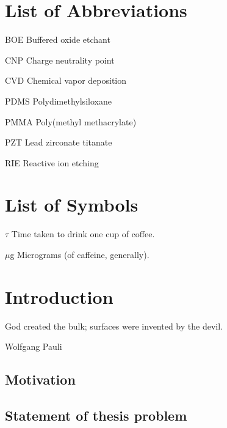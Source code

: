 \documentclass[edeposit,fullpage,draftthesis]{uiucthesis2009}
\begin{document}
\setcounter{tocdepth}{2}

\tableofcontents
\listoffigures

\chapter{List of Abbreviations}

\begin{symbollist*}
\item[BOE] Buffered oxide etchant
\item[CNP] Charge neutrality point
\item[CVD] Chemical vapor deposition
\item[PDMS] Polydimethylsiloxane
\item[PMMA] Poly(methyl methacrylate)
\item[PZT] Lead zirconate titanate
\item[RIE] Reactive ion etching
\end{symbollist*}

\chapter{List of Symbols}

\begin{symbollist}[0.7in]
\item[$\tau$] Time taken to drink one cup of coffee.
\item[$\mu$g] Micrograms (of caffeine, generally).
\end{symbollist}

\mainmatter
\chapter{Introduction}

   \epigraph{God created the bulk; surfaces were invented by the devil.}{Wolfgang Pauli}
    

    \section{Motivation}
    \section{Statement of thesis problem}
\end{document}
